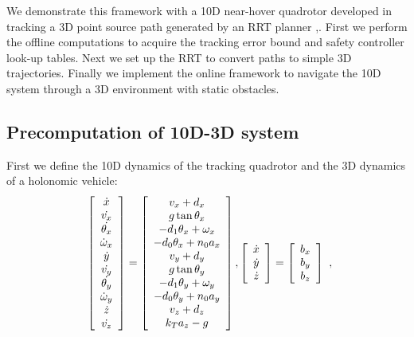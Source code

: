 We demonstrate this framework with a 10D near-hover quadrotor developed in \cite{Bouffard12} tracking a 3D point source path generated by an RRT planner \cite{Kuffner2000},\cite{Kavraki1996}. First we perform the offline computations to acquire the tracking error bound and safety controller look-up tables. Next we set up the RRT to convert paths to simple 3D trajectories. Finally we implement the online framework to navigate the 10D system through a 3D environment with static obstacles.

\subsection{Precomputation of 10D-3D system}
First we define the 10D dynamics of the tracking quadrotor and the 3D dynamics of a holonomic vehicle:
\begin{equation}
\small
\label{eq:Quad10D_dyn}
\begin{aligned}
\begin{array}{c}
\left[
\begin{array}{c}
\dot{x}\\
\dot{v_x}\\
\dot{\theta_x}\\
\dot\omega_x\\
\dot{y}\\
\dot{v_y}\\
\dot{\theta_y}\\
\dot\omega_y\\
\dot{z}\\
\dot{v_z}
\end{array}
\right]
=
\left[
\begin{array}{c}
v_x + d_x\\
g \tan \theta_x\\
-d_1 \theta_x + \omega_x\\
-d_0 \theta_x + n_0 a_x\\
v_y + d_y\\
g \tan \theta_y\\
-d_1 \theta_y + \omega_y\\
-d_0 \theta_y + n_0 a_y\\
v_z + d_z\\
k_T a_z - g
\end{array}
\right],
\left[
\begin{array}{c}
\dot{x}\\
\dot{y}\\
\dot{z}\\
\end{array}
\right] 
=
\left[
\begin{array}{c}
b_x\\
b_y\\
b_z \\
\end{array}
\right]
\end{array},\\
\end{aligned}
\end{equation}

